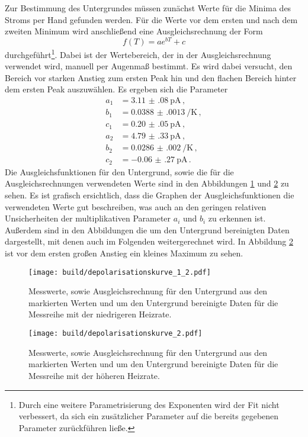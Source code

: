 Zur Bestimmung des Untergrundes müssen zunächst Werte für die Minima des Stroms per Hand gefunden
werden. Für die Werte vor dem ersten und nach dem zweiten Minimum wird anschließend eine Ausgleichsrechnung der
Form
\begin{equation*}
  f(T)=a e^{bT} +c
\end{equation*}
durchgeführt\footnote{Durch eine weitere Parametrisierung des Exponenten wird der Fit nicht verbessert, da sich ein zusätzlicher Parameter auf die bereits gegebenen Parameter zurückführen ließe.}. Dabei ist der Wertebereich, der in der Ausgleichsrechnung verwendet wird,
manuell per Augenmaß bestimmt. Es wird dabei versucht, den Bereich vor starken Anstieg zum ersten Peak hin und den flachen Bereich hinter dem ersten Peak auszuwählen.
Es ergeben sich die Parameter
\begin{align*}
  a_1&=\SI{3.11(08)}{\pico\ampere}  \,,\\
	b_1&=\SI{0.0388(0013)}{\per\kelvin}  \,,\\
  c_1&=\SI{0.20(05)}{\pico\ampere}  \,,\\
  a_2&=\SI{4.79(33)}{\pico\ampere}  \,,\\
	b_2&=\SI{0.0286(0020)}{\per\kelvin}  \,,\\
  c_2&=\SI{-0.06(27)}{\pico\ampere}  \,.
\end{align*}
Die Ausgleichsfunktionen für den Untergrund, sowie die für die Ausgleichsrechnungen
verwendeten Werte sind in den Abbildungen \ref{fig:depol1} und \ref{fig:depol2} zu sehen.
Es ist grafisch ersichtlich, dass die Graphen der Ausgleichsfunktionen die verwendeten Werte gut beschreiben, was auch an den geringen relativen Unsicherheiten der multiplikativen Parameter $a_i$ und $b_i$ zu erkennen ist.
Außerdem sind in den Abbildungen die um den Untergrund bereinigten Daten dargestellt, mit denen auch im Folgenden weitergerechnet wird.
In Abbildung \ref{fig:depol2} ist vor dem ersten großen Anstieg ein kleines
Maximum zu sehen.

\begin{figure}
  \centering
  \texttt{[image: build/depolarisationskurve\_1\_2.pdf]}
  \caption{Messwerte, sowie Ausgleichsrechnung für den Untergrund aus den markierten Werten
  und um den Untergrund bereinigte Daten für die Messreihe mit der niedrigeren Heizrate.}
  \label{fig:depol1}
\end{figure}
\begin{figure}
  \centering
  \texttt{[image: build/depolarisationskurve\_2.pdf]}
  \caption{Messwerte, sowie Ausgleichsrechnung für den Untergrund aus den markierten Werten
  und um den Untergrund bereinigte Daten für die Messreihe mit der höheren Heizrate.
	\cite{wieso haben wir hier dieses komische Maximum?.}}
  \label{fig:depol2}
\end{figure}

